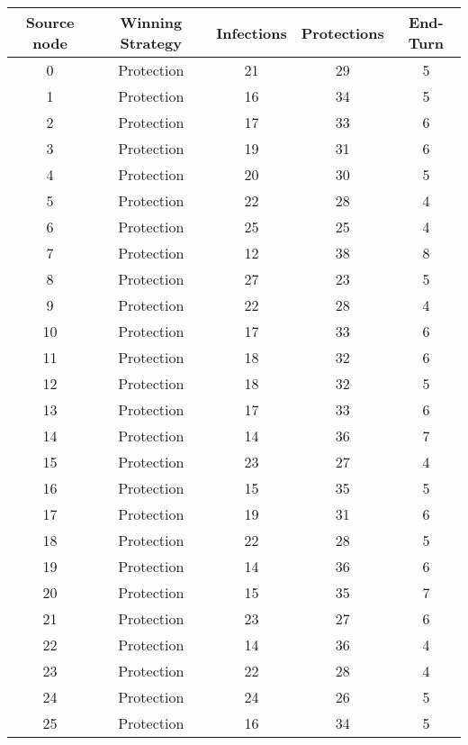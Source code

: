 \documentclass[results.tex]{subfiles}
\begin{document}
\begin{center}
  \begin{tabular}{| c || c | c | c | c |}
    \hline
    {\bfseries Source node} & {\bfseries Winning Strategy} & {\bfseries Infections} & {\bfseries Protections} & {\bfseries End-Turn} \\  %
    \hline\hline
    0 & Protection & 21 & 29 & 5 \\ 
    \hline
    1 & Protection & 16 & 34 & 5 \\ 
    \hline
    2 & Protection & 17 & 33 & 6 \\ 
    \hline
    3 & Protection & 19 & 31 & 6 \\ 
    \hline
    4 & Protection & 20 & 30 & 5 \\ 
    \hline
    5 & Protection & 22 & 28 & 4 \\ 
    \hline
    6 & Protection & 25 & 25 & 4 \\ 
    \hline
    7 & Protection & 12 & 38 & 8 \\ 
    \hline
    8 & Protection & 27 & 23 & 5 \\ 
    \hline
    9 & Protection & 22 & 28 & 4 \\ 
    \hline
    10 & Protection & 17 & 33 & 6 \\ 
    \hline
    11 & Protection & 18 & 32 & 6 \\ 
    \hline
    12 & Protection & 18 & 32 & 5 \\ 
    \hline
    13 & Protection & 17 & 33 & 6 \\ 
    \hline
    14 & Protection & 14 & 36 & 7 \\ 
    \hline
    15 & Protection & 23 & 27 & 4 \\ 
    \hline
    16 & Protection & 15 & 35 & 5 \\ 
    \hline
    17 & Protection & 19 & 31 & 6 \\ 
    \hline
    18 & Protection & 22 & 28 & 5 \\ 
    \hline
    19 & Protection & 14 & 36 & 6 \\ 
    \hline
    20 & Protection & 15 & 35 & 7 \\ 
    \hline
    21 & Protection & 23 & 27 & 6 \\ 
    \hline
    22 & Protection & 14 & 36 & 4 \\ 
    \hline
    23 & Protection & 22 & 28 & 4 \\ 
    \hline
    24 & Protection & 24 & 26 & 5 \\ 
    \hline
    25 & Protection & 16 & 34 & 5 \\ 

\end{tabular}
\end{center}
\end{document}
